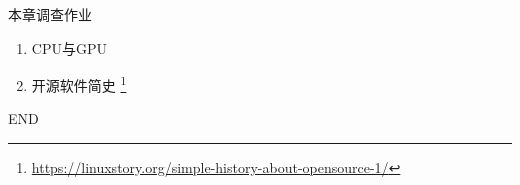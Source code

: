 \begin{frame}[fragile]{本章调查作业}
  \begin{enumerate}
  \item CPU与GPU
  \item 开源软件简史 \footnote{\url{https://linuxstory.org/simple-history-about-opensource-1/}}
  \end{enumerate}
\end{frame}


\begin{frame}[fragile]{END}
  ~
\end{frame}  


